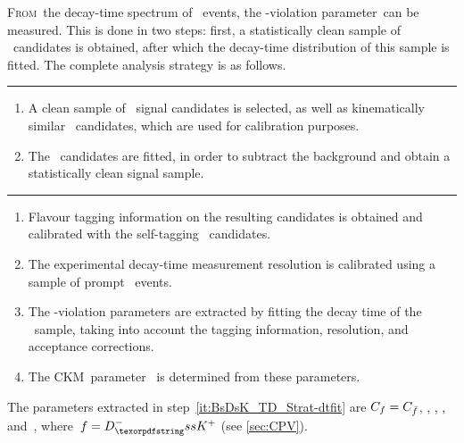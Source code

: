 \clearpage
\thispagestyle{plain}
\lettrine{F}{rom}~the decay-time spectrum of \BsDsK~events, the \CP-violation parameter~\CPgamma can be measured.
This is done in two steps: first, a statistically clean sample of \BsDsK~candidates is obtained, after which the decay-time distribution of this sample is fitted.
The complete analysis strategy is as follows.\\

\noindent \textbf{\large{}}
\vspace{.5ex}\hrule
\begin{enumerate}
    \item A clean sample of \BsDsK~signal candidates is selected, as well as kinematically similar \BsDsPi~candidates, which are used for calibration purposes.
    \item The \BsDsK~candidates are fitted, in order to subtract the background and obtain a statistically clean signal sample.
     \setcounter{enumvalue}{\value{enumi}}
\end{enumerate}

\noindent \textbf{\large{}}
\vspace{.5ex}\hrule
\begin{enumerate}
    \setcounter{enumi}{\value{enumvalue}}
    \item Flavour tagging information on the resulting candidates is obtained and calibrated with the self-tagging \BsDsPi~candidates.
    \item The experimental decay-time measurement resolution is calibrated using a sample of prompt \Dsmp~events.
    \item \label{it:BsDsK_TD_Strat-dtfit} The \CP-violation parameters are extracted by fitting the decay time of the \Bs~sample, taking into account the tagging information, resolution, and acceptance corrections.
    \item The CKM~parameter \CPgamma~is determined from these parameters.
\end{enumerate}
%
The parameters extracted in step~\ref{it:BsDsK_TD_Strat-dtfit} are \({C_{f} = C_{\bar{f}}}\), \Spar, \Sbpar, \Dpar, and~\Dbpar, where~\({f = \DsmKp}\) (see \cref{sec:CPV}).

\clearpage

